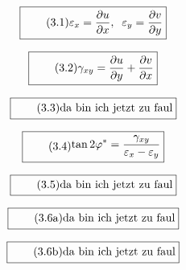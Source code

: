 \documentclass[11pt]{article}
\newcommand{\1}{ {\mathds{1}} }
\begin{document}
    \begin{equation}
      \boxed{
        \tag{3.1}
        \begin{split}
          \varepsilon_x
          =
          \frac{\partial u}{\partial x}, \;\;
          \varepsilon_y
          =
          \frac{\partial v}{\partial y}         
        \end{split}
      }
    \end{equation}    

    \begin{equation}
      \boxed{
        \tag{3.2}
        \begin{split}
          \gamma_{xy}
          =
          \frac{\partial u}{\partial y}
          +
          \frac{\partial v}{\partial x}
        \end{split}
      }
    \end{equation}    

    \begin{equation}
      \boxed{
        \tag{3.3}
        \begin{split}
          \text{da bin ich jetzt zu faul}
        \end{split}
      }
    \end{equation}    

    \begin{equation}
      \boxed{
        \tag{3.4}
        \begin{split}
          \tan 2\varphi^\ast
          =
          \frac{\gamma_{xy}}{\varepsilon_x -\varepsilon_y}
        \end{split}
      }
    \end{equation}

    \begin{equation}
      \boxed{
        \tag{3.5}
        \begin{split}
          \text{da bin ich jetzt zu faul}
        \end{split}
      }
    \end{equation}    

    \begin{equation}
      \boxed{
        \tag{3.6a}
        \begin{split}
          \text{da bin ich jetzt zu faul}
        \end{split}
      }
    \end{equation}    

    \begin{equation}
      \boxed{
        \tag{3.6b}
        \begin{split}
          \text{da bin ich jetzt zu faul}
        \end{split}
      }
    \end{equation}    
\end{document}

